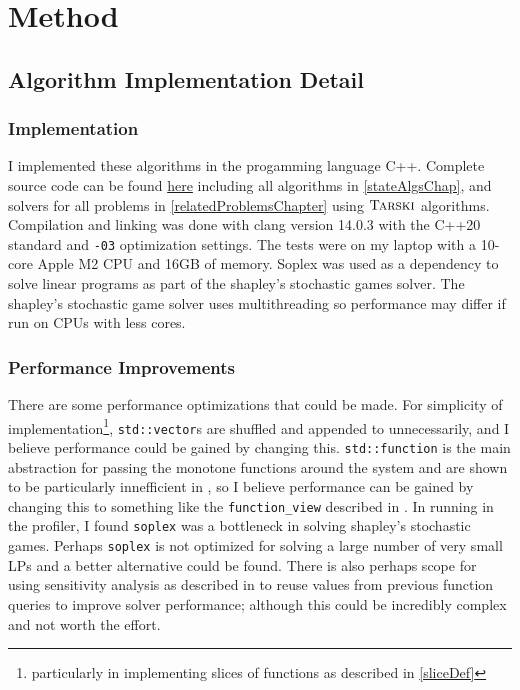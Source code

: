 \section{Method}
\subsection{Algorithm Implementation Detail}
\subsubsection{Implementation}
I implemented these algorithms in the progamming language C++.
Complete source code can be found \href{https://github.com/angusjoshi/tarski}{here}
including all algorithms in \cref{stateAlgsChap},
and solvers for all problems in \cref{relatedProblemsChapter} using $\textsc{Tarski}$ algorithms.
Compilation and linking was done with
clang version 14.0.3 with the C++20 standard and \lstinline{-03} optimization settings.
The tests were on my laptop with a 10-core Apple M2 CPU and 16GB of memory.
Soplex\citep{soplex} was used as a dependency to solve linear programs
as part of the shapley's stochastic games solver.
The shapley's stochastic game solver uses multithreading so performance may differ
if run on CPUs with less cores.\\
\subsubsection{Performance Improvements}
There are some performance optimizations that could be made. For simplicity of implementation\footnote{particularly
in implementing slices of functions as described in \cref{sliceDef}},
\lstinline{std::vector}s are shuffled and appended to unnecessarily, and I believe
performance could be gained by changing this. \lstinline{std::function} is the main abstraction for passing
the monotone functions around the system and are shown to be particularly innefficient in \citep{stdFunctionBad},
so I believe performance can be gained by changing this to something like the \lstinline{function_view}
described in \citep{stdFunctionBad}.
In running in the profiler, I found \lstinline{soplex} was a bottleneck in solving shapley's stochastic games.
Perhaps \lstinline{soplex} is not optimized for solving a large number of very small LPs and a better alternative could be found.
There is also perhaps scope for using sensitivity
analysis as described in \citep{sensAnalysis} to reuse values from previous function queries to improve
solver performance; although this could be incredibly complex and not worth the effort.

